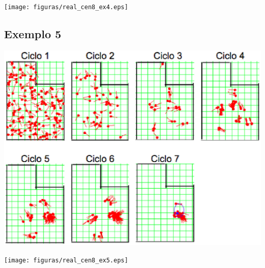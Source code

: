 {\centering
\texttt{[image: figuras/real\_cen8\_ex4.eps]}
\label{img:real_cen8_ex4}
\par}

\subsection{Exemplo 5}

{\centering
\includegraphics[scale=0.4]{figuras/cen8_ex5.eps}
\label{img:cen8_ex5}
\par}

{\centering
\texttt{[image: figuras/real\_cen8\_ex5.eps]}
\label{img:real_cen8_ex5}
\par}
